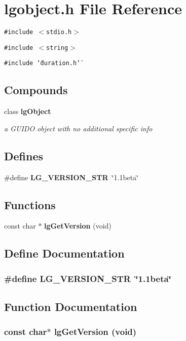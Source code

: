\section{lgobject.h File Reference}
\label{lgobject_8h}
{\tt \#include $<$stdio.h$>$}\par
{\tt \#include $<$string$>$}\par
{\tt \#include \char`\"{}duration.h\char`\"{}}\par
\subsection*{Compounds}
\begin{CompactItemize}
\item 
class {\bf lg\-Object}
\begin{CompactList}\small\item\em a GUIDO object with no additional specific info \item\end{CompactList}\end{CompactItemize}
\subsection*{Defines}
\begin{CompactItemize}
\item 
\#define {\bf LG\_\-VERSION\_\-STR}\ \char`\"{}1.1beta\char`\"{}
\end{CompactItemize}
\subsection*{Functions}
\begin{CompactItemize}
\item 
const char $\ast$ {\bf lg\-Get\-Version} (void)
\end{CompactItemize}


\subsection{Define Documentation}
\subsubsection{\setlength{\rightskip}{0pt plus 5cm}\#define LG\_\-VERSION\_\-STR\ \char`\"{}1.1beta\char`\"{}}\label{lgobject_8h_a0}




\subsection{Function Documentation}
\subsubsection{\setlength{\rightskip}{0pt plus 5cm}const char$\ast$ lg\-Get\-Version (void)}\label{lgobject_8h_a1}



